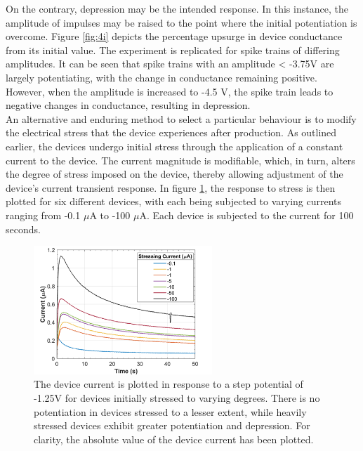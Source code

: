 \noindent On the contrary, depression may be the intended response. In this instance, the amplitude of impulses may be raised to the point where the initial potentiation is overcome. Figure \ref{fig:4i} depicts the percentage upsurge in device conductance from its initial value. The experiment is replicated for spike trains of differing amplitudes. It can be seen that spike trains with an amplitude < -3.75V are largely potentiating, with the change in conductance remaining positive. However, when the amplitude is increased to -4.5 V, the spike train leads to negative changes in conductance, resulting in depression.\\



\noindent An alternative and enduring method to select a particular behaviour is to modify the electrical stress that the device experiences after production. As outlined earlier, the devices undergo initial stress through the application of a constant current to the device. The current magnitude is modifiable, which, in turn, alters the degree of stress imposed on the device, thereby allowing adjustment of the device's current transient response. In figure \ref{fig:4j}, the response to stress is then plotted for six different devices, with each being subjected to varying currents ranging from -0.1 $\mu$A to -100 $\mu$A. Each device is subjected to the current for 100 seconds.\\

\begin{figure}[htbp!] 
    \centering    
    \includegraphics[width=0.6\textwidth]{Chapter4/Figs/j.png}
    \caption[Device current dependence on stressing magnitudes.]{The device current is plotted in response to a step potential of -1.25V for devices initially stressed to varying degrees. There is no potentiation in devices stressed to a lesser extent, while heavily stressed devices exhibit greater potentiation and depression. For clarity, the absolute value of the device current has been plotted.}
    \label{fig:4j}
\end{figure}


